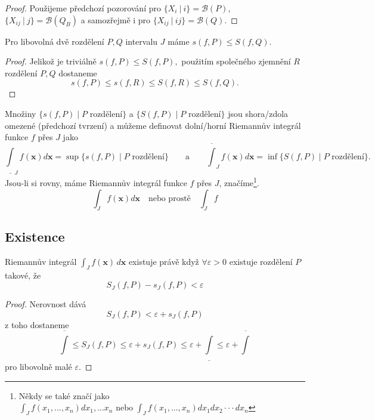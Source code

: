 \documentclass[../main.tex]{subfiles}
\begin{document}
\begin{proof}
	Použijeme předchozí pozorování pro $\{X_i\ |\ i\} = \mathcal{B}(P)$, $\{X_{ij}\ |\ j\} = \mathcal{B}(Q_B)$ a samozřejmě
	i pro $\{X_{ij}\ |\ ij\} = \mathcal{B}(Q).$
\end{proof}

\begin{lemma}
	Pro libovolná dvě rozdělení $P,Q$ intervalu $J$ máme $s(f,P) \leq S(f,Q)$.
\end{lemma}

\begin{proof}
	Jelikož je triviálně $s(f,P) \leq S(f,P),$ použitím společného zjemnění $R$ rozdělení $P,Q$ dostaneme
	\[s(f,P) \leq s(f,R) \leq S(f,R) \leq S(f,Q).\]
\end{proof}

\begin{definition}
	Množiny $\{s(f,P) \mid P \text{ rozdělení}\}$ a $\{S(f,P) \mid P \text{ rozdělení}\}$ jsou shora/zdola omezené (předchozí tvrzení) a můžeme definovat dolní/horní Riemannův integrál funkce $f$ přes $J$ jako
	\[\underline{\int}_J f(\textbf{x})d\textbf{x} = \sup\{s(f,P) \mid P \text{ rozdělení}\} \qquad \text{a} \qquad
	\overline{\int}_J f(\textbf{x})d\textbf{x} = \inf\{S(f,P) \mid P \text{ rozdělení}\}.\]
	Jsou-li si rovny, máme Riemannův integrál funkce $f$ přes $J$, značíme\footnote{Někdy se také značí jako \(\int_J f(x_1,...,x_n)dx_1,...x_n \text{ nebo } \int_J f(x_1,...,x_n)dx_1 dx_2\cdot \cdot \cdot dx_n\)}.
	$$\int_J f(\textbf{x})d\textbf{x} \quad \text{nebo prostě} \quad \int_J f $$
\end{definition}

\subsection{Existence}
\begin{theorem}
	Riemannův integrál $\int_{J} f(\mathbf{x}) \,d\mathbf{x}$ existuje právě když
	$\forall \varepsilon > 0$ existuje rozdělení $P$ takové, že
	\[ S_J(f,P) - s_J(f,P) < \varepsilon \]
\end{theorem}

\begin{proof}
	Nerovnost dává \[ S_J(f,P) < \varepsilon + s_J(f,P) \]
	z toho dostaneme
	\[ \overline{\int} \leq S_J(f,P) \leq \varepsilon + s_J(f,P) \leq \varepsilon + \underline{\int} \leq
	\varepsilon + \overline{\int}\]
	pro libovolně malé $\varepsilon$.
\end{proof}
\end{document}
